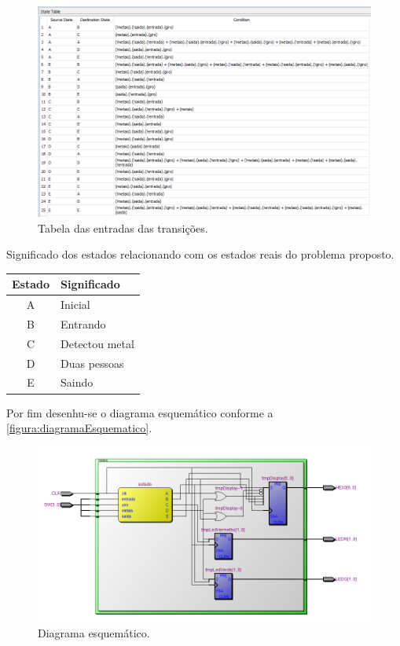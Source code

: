 		\begin{figure}[H]
			 \centering
			 \caption{\label{figura:tabelaDeTransicao}Tabela das entradas das transições.}
			 \includegraphics[width=1\textwidth]{img/tabelaDeTransicao}
		\end{figure}

		\begin{quadro}[H]
			\centering
			\caption{Significado dos estados relacionando com os estados reais do problema proposto.}
			\label{quadro:significadoEstados}
			\begin{tabular}{|c|l|}
			  \hline
			   \textbf{Estado} & \textbf{Significado}\\
			    \hline
				   A & Inicial \\
			   	\hline
			   		B & Entrando \\
			    \hline
					C & Detectou metal \\
			    \hline
			    	D & Duas pessoas \\
			    \hline
					E & Saindo \\
				\hline
			\end{tabular}
		\end{quadro}

		Por fim desenhu-se o diagrama esquemático conforme a \autoref{figura:diagramaEsquematico}.

		\begin{figure}[H]
			 \centering
			 \caption{\label{figura:diagramaEsquematico}Diagrama esquemático.}
			 \includegraphics[width=1\textwidth]{img/diagramaEsquematico}
		\end{figure}


